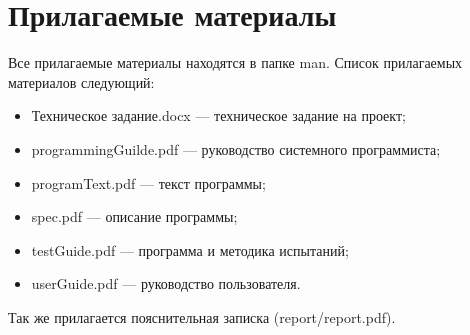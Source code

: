 \documentclass[12pt,a4paper]{report}
\begin{document}
	
	\renewcommand{\thesection}{\arabic{section}}
	\setcounter{page}{2}
	\tableofcontents
	\pagebreak
	
	\setcounter{totalnumber}{10}
	\setcounter{topnumber}{10}
	\setcounter{bottomnumber}{10}
	\renewcommand{\topfraction}{1}
	\renewcommand{\textfraction}{0}
	
	
	
	
	
	
	
	\FloatBarrier
			
	\pagebreak
	
	
	\pagebreak	
	\section{Прилагаемые материалы}
	Все прилагаемые материалы находятся в папке man.
	Список прилагаемых материалов следующий:
	\begin{itemize}
		\item Техническое задание.docx --- техническое задание на проект;
		\item programmingGuilde.pdf --- руководство системного программиста;
		\item programText.pdf --- текст программы;
		\item spec.pdf --- описание программы;
		\item testGuide.pdf --- программа и методика испытаний;
		\item userGuide.pdf --- руководство пользователя.
	\end{itemize}
	Так же прилагается пояснительная записка (report/report.pdf).
	
	
	\pagebreak
	
\end{document}
